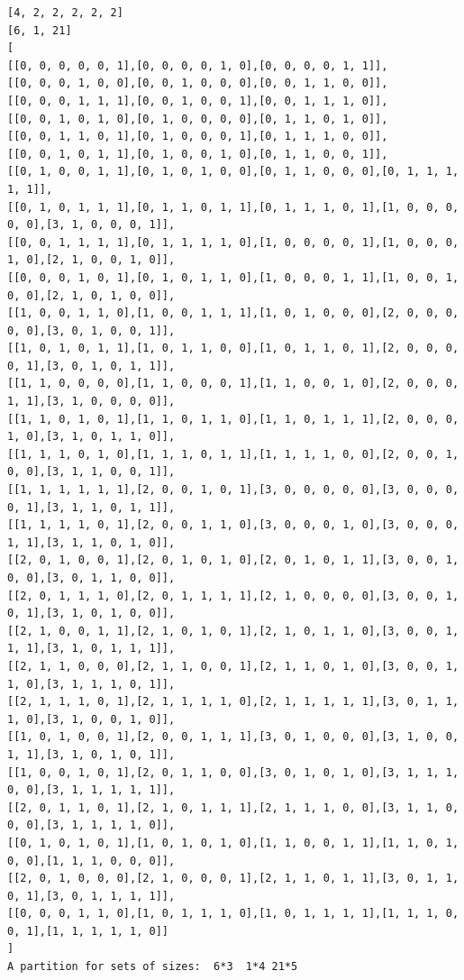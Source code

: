 \documentclass[final]{dmtcs-episciences}
\begin{document}
\begin{appendices}
\begin{verbatim} 
[4, 2, 2, 2, 2, 2]
[6, 1, 21]
[
[[0, 0, 0, 0, 0, 1],[0, 0, 0, 0, 1, 0],[0, 0, 0, 0, 1, 1]],
[[0, 0, 0, 1, 0, 0],[0, 0, 1, 0, 0, 0],[0, 0, 1, 1, 0, 0]],
[[0, 0, 0, 1, 1, 1],[0, 0, 1, 0, 0, 1],[0, 0, 1, 1, 1, 0]],
[[0, 0, 1, 0, 1, 0],[0, 1, 0, 0, 0, 0],[0, 1, 1, 0, 1, 0]],
[[0, 0, 1, 1, 0, 1],[0, 1, 0, 0, 0, 1],[0, 1, 1, 1, 0, 0]],
[[0, 0, 1, 0, 1, 1],[0, 1, 0, 0, 1, 0],[0, 1, 1, 0, 0, 1]],
[[0, 1, 0, 0, 1, 1],[0, 1, 0, 1, 0, 0],[0, 1, 1, 0, 0, 0],[0, 1, 1, 1, 1, 1]],
[[0, 1, 0, 1, 1, 1],[0, 1, 1, 0, 1, 1],[0, 1, 1, 1, 0, 1],[1, 0, 0, 0, 0, 0],[3, 1, 0, 0, 0, 1]],
[[0, 0, 1, 1, 1, 1],[0, 1, 1, 1, 1, 0],[1, 0, 0, 0, 0, 1],[1, 0, 0, 0, 1, 0],[2, 1, 0, 0, 1, 0]],
[[0, 0, 0, 1, 0, 1],[0, 1, 0, 1, 1, 0],[1, 0, 0, 0, 1, 1],[1, 0, 0, 1, 0, 0],[2, 1, 0, 1, 0, 0]],
[[1, 0, 0, 1, 1, 0],[1, 0, 0, 1, 1, 1],[1, 0, 1, 0, 0, 0],[2, 0, 0, 0, 0, 0],[3, 0, 1, 0, 0, 1]],
[[1, 0, 1, 0, 1, 1],[1, 0, 1, 1, 0, 0],[1, 0, 1, 1, 0, 1],[2, 0, 0, 0, 0, 1],[3, 0, 1, 0, 1, 1]],
[[1, 1, 0, 0, 0, 0],[1, 1, 0, 0, 0, 1],[1, 1, 0, 0, 1, 0],[2, 0, 0, 0, 1, 1],[3, 1, 0, 0, 0, 0]],
[[1, 1, 0, 1, 0, 1],[1, 1, 0, 1, 1, 0],[1, 1, 0, 1, 1, 1],[2, 0, 0, 0, 1, 0],[3, 1, 0, 1, 1, 0]],
[[1, 1, 1, 0, 1, 0],[1, 1, 1, 0, 1, 1],[1, 1, 1, 1, 0, 0],[2, 0, 0, 1, 0, 0],[3, 1, 1, 0, 0, 1]],
[[1, 1, 1, 1, 1, 1],[2, 0, 0, 1, 0, 1],[3, 0, 0, 0, 0, 0],[3, 0, 0, 0, 0, 1],[3, 1, 1, 0, 1, 1]],
[[1, 1, 1, 1, 0, 1],[2, 0, 0, 1, 1, 0],[3, 0, 0, 0, 1, 0],[3, 0, 0, 0, 1, 1],[3, 1, 1, 0, 1, 0]],
[[2, 0, 1, 0, 0, 1],[2, 0, 1, 0, 1, 0],[2, 0, 1, 0, 1, 1],[3, 0, 0, 1, 0, 0],[3, 0, 1, 1, 0, 0]],
[[2, 0, 1, 1, 1, 0],[2, 0, 1, 1, 1, 1],[2, 1, 0, 0, 0, 0],[3, 0, 0, 1, 0, 1],[3, 1, 0, 1, 0, 0]],
[[2, 1, 0, 0, 1, 1],[2, 1, 0, 1, 0, 1],[2, 1, 0, 1, 1, 0],[3, 0, 0, 1, 1, 1],[3, 1, 0, 1, 1, 1]],
[[2, 1, 1, 0, 0, 0],[2, 1, 1, 0, 0, 1],[2, 1, 1, 0, 1, 0],[3, 0, 0, 1, 1, 0],[3, 1, 1, 1, 0, 1]],
[[2, 1, 1, 1, 0, 1],[2, 1, 1, 1, 1, 0],[2, 1, 1, 1, 1, 1],[3, 0, 1, 1, 1, 0],[3, 1, 0, 0, 1, 0]],
[[1, 0, 1, 0, 0, 1],[2, 0, 0, 1, 1, 1],[3, 0, 1, 0, 0, 0],[3, 1, 0, 0, 1, 1],[3, 1, 0, 1, 0, 1]],
[[1, 0, 0, 1, 0, 1],[2, 0, 1, 1, 0, 0],[3, 0, 1, 0, 1, 0],[3, 1, 1, 1, 0, 0],[3, 1, 1, 1, 1, 1]],
[[2, 0, 1, 1, 0, 1],[2, 1, 0, 1, 1, 1],[2, 1, 1, 1, 0, 0],[3, 1, 1, 0, 0, 0],[3, 1, 1, 1, 1, 0]],
[[0, 1, 0, 1, 0, 1],[1, 0, 1, 0, 1, 0],[1, 1, 0, 0, 1, 1],[1, 1, 0, 1, 0, 0],[1, 1, 1, 0, 0, 0]],
[[2, 0, 1, 0, 0, 0],[2, 1, 0, 0, 0, 1],[2, 1, 1, 0, 1, 1],[3, 0, 1, 1, 0, 1],[3, 0, 1, 1, 1, 1]],
[[0, 0, 0, 1, 1, 0],[1, 0, 1, 1, 1, 0],[1, 0, 1, 1, 1, 1],[1, 1, 1, 0, 0, 1],[1, 1, 1, 1, 1, 0]]
]
A partition for sets of sizes:  6*3  1*4 21*5
\end{verbatim}
\newpage


\end{appendices}
\end{document}
